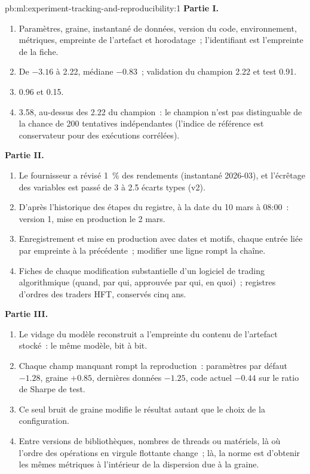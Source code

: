 \begin{solution}{pb:ml:experiment-tracking-and-reproducibility:1}
\textbf{Partie I.}
\begin{enumerate}
\item Paramètres, graine, instantané de données, version du code, environnement, métriques, empreinte de l'artefact et horodatage~; l'identifiant est
l'empreinte de la fiche.
\item De $-3.16$ à 2.22, médiane $-0.83$~; validation du champion 2.22 et test 0.91.
\item 0.96 et 0.15.
\item 3.58, au-dessus des 2.22 du champion~: le champion n'est pas distinguable de la chance de 200 tentatives indépendantes (l'indice de référence
est conservateur pour des exécutions corrélées).
\end{enumerate}
\textbf{Partie II.}
\begin{enumerate}[resume]
\item Le fournisseur a révisé 1~\% des rendements (instantané 2026-03), et l'écrêtage des variables est passé de 3 à 2.5 écarts types (v2).
\item D'après l'historique des étapes du registre, à la date du 10 mars à 08:00~: version 1, mise en production le 2 mars.
\item Enregistrement et mise en production avec dates et motifs, chaque entrée liée par empreinte à la précédente~; modifier une ligne rompt la chaîne.
\item Fiches de chaque modification substantielle d'un logiciel de trading algorithmique (quand, par qui, approuvée par qui, en quoi)~; registres d'ordres des
traders HFT, conservés cinq ans.
\end{enumerate}
\textbf{Partie III.}
\begin{enumerate}[resume]
\item Le vidage du modèle reconstruit a l'empreinte du contenu de l'artefact stocké~: le même modèle, bit à bit.
\item Chaque champ manquant rompt la reproduction~: paramètres par défaut $-1.28$, graine $+0.85$, dernières données $-1.25$, code actuel
$-0.44$ sur le ratio de Sharpe de test.
\item Ce seul bruit de graine modifie le résultat autant que le choix de la configuration.
\item Entre versions de bibliothèques, nombres de threads ou matériels, là où l'ordre des opérations en virgule flottante change~; là, la norme est
d'obtenir les mêmes métriques à l'intérieur de la dispersion due à la graine.

\end{enumerate}
\end{solution}
